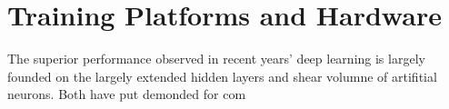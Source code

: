 \section{Training Platforms and Hardware}
The superior performance observed in recent years' deep learning is largely founded on the largely extended hidden layers and shear volumne of artifitial neurons. Both have put demonded for com